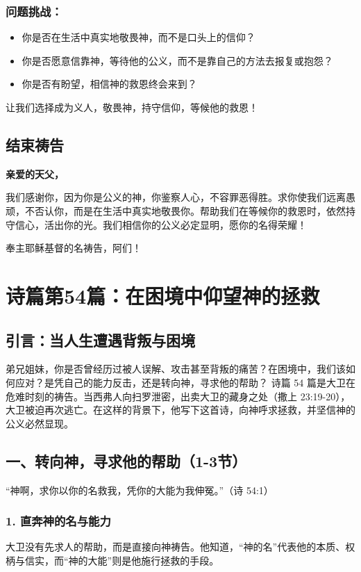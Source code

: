 \documentclass[a4paper, 12pt]{article}
\begin{document}
\subsubsection*{问题挑战：}
\begin{itemize}
    \item 你是否在生活中真实地敬畏神，而不是口头上的信仰？

    \item 你是否愿意信靠神，等待他的公义，而不是靠自己的方法去报复或抱怨？

    \item 你是否有盼望，相信神的救恩终会来到？

\end{itemize}

让我们选择成为义人，敬畏神，持守信仰，等候他的救恩！

\subsection*{结束祷告}
\textbf{亲爱的天父，}

我们感谢你，因为你是公义的神，你鉴察人心，不容罪恶得胜。求你使我们远离愚顽，不否认你，而是在生活中真实地敬畏你。帮助我们在等候你的救恩时，依然持守信心，活出你的光。我们相信你的公义必定显明，愿你的名得荣耀！

奉主耶稣基督的名祷告，阿们！
\newpage
\section{诗篇第54篇：在困境中仰望神的拯救}

\subsection*{引言：当人生遭遇背叛与困境}
弟兄姐妹，你是否曾经历过被人误解、攻击甚至背叛的痛苦？在困境中，我们该如何应对？是凭自己的能力反击，还是转向神，寻求他的帮助？
诗篇 54 篇是大卫在危难时刻的祷告。当西弗人向扫罗泄密，出卖大卫的藏身之处（撒上 23:19-20），大卫被迫再次逃亡。在这样的背景下，他写下这首诗，向神呼求拯救，并坚信神的公义必然显现。

\subsection*{一、转向神，寻求他的帮助（1-3节）}
“神啊，求你以你的名救我，凭你的大能为我伸冤。”（诗 54:1）

\subsubsection*{1. 直奔神的名与能力}
\hspace{0.6cm}大卫没有先求人的帮助，而是直接向神祷告。他知道，“神的名”代表他的本质、权柄与信实，而“神的大能”则是他施行拯救的手段。
\end{document}
